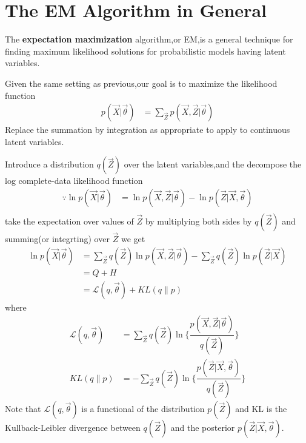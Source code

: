 \section{The EM Algorithm in General}
The \textbf{expectation maximization} algorithm,or EM,is a general technique for finding maximum likelihood solutions for probabilistic models having latent variables.

Given the same setting as previous,our goal is to maximize the likelihood function
\begin{align}
p(\vec{X}|\vec{\theta}) &=\sum_{\vec{Z}}p(\vec{X},\vec{Z}|\vec{\theta}) 
\end{align}
Replace the summation by integration as appropriate to apply to continuous latent variables.

Introduce a distribution $q(\vec{Z})$ over the latent variables,and the decompose the log complete-data likelihood function
\begin{align}
\because \ln p(\vec{X}|\vec{\theta}) &=\ln p(\vec{X},\vec{Z}|\vec{\theta}) -\ln p(\vec{Z}|\vec{X},\vec{\theta}) \\
\end{align}
take the expectation over values of $\vec{Z}$ by multiplying both sides by $q(\vec{Z})$ and summing(or integrting) over $\vec{Z}$ we get
\begin{align}
\ln p(\vec{X}|\vec{\theta}) &=\sum_{\vec{Z}}q(\vec{Z})\ln p(\vec{X},\vec{Z}|\vec{\theta})-\sum_{\vec{Z}}q(\vec{Z})\ln p(\vec{Z}|\vec{X}) \\
&=Q+H \\
&=\mathcal{L}(q,\vec{\theta})+KL(q\parallel p)
\end{align}
where
\begin{align}
\mathcal{L}(q,\vec{\theta})
&=\sum_{\vec{Z}}q(\vec{Z})\ln
\{\dfrac{p(\vec{X},\vec{Z}|\vec{\theta})}{q(\vec{Z})} \} \\
KL(q\parallel p)
&=-\sum_{\vec{Z}}{q(\vec{Z})\ln
	\{\dfrac{p(\vec{Z}|\vec{X},\vec{\theta})}
		 {q(\vec{Z})}\}}
\end{align}
Note that $\mathcal{L}(q,\vec{\theta})$ is a functional of the distribution $p(\vec{Z})$ and KL is the Kullback-Leibler divergence between $q(\vec{Z})$ and the posterior $p(\vec{Z}|\vec{X},\vec{\theta})$.













